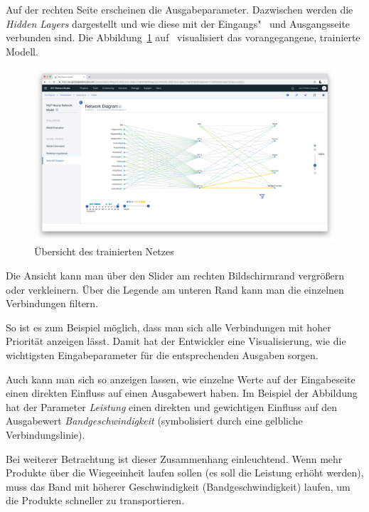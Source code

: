 Auf der rechten Seite erscheinen die Ausgabeparameter. Dazwischen werden die \textit{Hidden Layers} dargestellt und wie
diese mit der Eingangs"~ und Ausgangsseite verbunden sind. Die Abbildung~\ref{fig:umsetzung_model_network_diagram}
auf~\pageref{fig:umsetzung_model_network_diagram} visualisiert das vorangegangene, trainierte Modell.

\begin{figure}[h]
    \centering
    \includegraphics[width=\textwidth]{images/kapitel_3/model_network_diagram.png}
    \caption{Übersicht des trainierten Netzes}
    \label{fig:umsetzung_model_network_diagram}
\end{figure}

Die Ansicht kann man über den Slider am rechten Bildschirmrand vergrößern oder verkleinern. Über die Legende am unteren
Rand kann man die einzelnen Verbindungen filtern.

So ist es zum Beispiel möglich, dass man sich alle Verbindungen mit hoher Priorität anzeigen lässt. Damit hat der
Entwickler eine Visualisierung, wie die wichtigsten Eingabeparameter für die entsprechenden Ausgaben sorgen.

Auch kann man sich so anzeigen lassen, wie einzelne Werte auf der Eingabeseite einen direkten Einfluss auf einen
Ausgabewert haben. Im Beispiel der Abbildung hat der Parameter \textit{Leistung} einen direkten und gewichtigen
Einfluss auf den Ausgabewert \textit{Bandgeschwindigkeit} (symbolisiert durch eine gelbliche Verbindungslinie).

Bei weiterer Betrachtung ist dieser Zusammenhang einleuchtend. Wenn mehr Produkte über die Wiegeeinheit laufen sollen
(es soll die Leistung erhöht werden), muss das Band mit höherer Geschwindigkeit (Bandgeschwindigkeit) laufen, um die
Produkte schneller zu transportieren.

